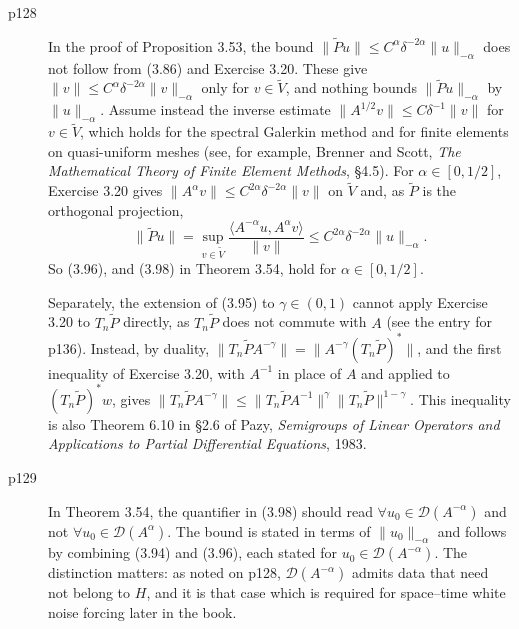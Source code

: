 \documentclass[final]{article}
\theoremstyle{definition}
\begin{document}
\begin{enumerate}
\begin{description}
   \item[p128] In the proof of Proposition 3.53, the bound
$\|\tilde P u\|\le C^\alpha\delta^{-2\alpha}\|u\|_{-\alpha}$ does not follow
from (3.86) and Exercise 3.20. These give
$\|v\|\le C^\alpha\delta^{-2\alpha}\|v\|_{-\alpha}$ only for $v\in\tilde V$,
and nothing bounds $\|\tilde Pu\|_{-\alpha}$ by $\|u\|_{-\alpha}$. Assume
instead the inverse estimate $\|A^{1/2}v\|\le C\delta^{-1}\|v\|$ for
$v\in\tilde V$, which holds for the spectral Galerkin method and for finite
elements on quasi-uniform meshes (see, for example, Brenner and Scott,
\emph{The Mathematical Theory of Finite Element Methods}, \S4.5). For
$\alpha\in[0,1/2]$, Exercise 3.20 gives
$\|A^\alpha v\|\le C^{2\alpha}\delta^{-2\alpha}\|v\|$ on $\tilde V$ and, as
$\tilde P$ is the orthogonal projection,
\[
\|\tilde Pu\|=\sup_{v\in\tilde V}\frac{\langle A^{-\alpha}u,A^{\alpha}v\rangle}{\|v\|}
\le C^{2\alpha}\delta^{-2\alpha}\|u\|_{-\alpha}.
\]
So (3.96), and (3.98) in Theorem 3.54, hold for $\alpha\in[0,1/2]$.

Separately, the extension of (3.95) to $\gamma\in(0,1)$ cannot apply Exercise
3.20 to $T_n\tilde P$ directly, as $T_n\tilde P$ does not commute with $A$ (see
the entry for p136). Instead, by duality,
$\|T_n\tilde PA^{-\gamma}\|=\|A^{-\gamma}(T_n\tilde P)^*\|$, and the first
inequality of Exercise 3.20, with $A^{-1}$ in place of $A$ and applied to
$(T_n\tilde P)^*w$, gives
$\|T_n\tilde PA^{-\gamma}\|\le\|T_n\tilde PA^{-1}\|^{\gamma}\|T_n\tilde
P\|^{1-\gamma}$. This inequality is also Theorem 6.10 in \S2.6 of
Pazy, \emph{Semigroups of Linear Operators and Applications to Partial
Differential Equations}, 1983.
   \item[p129] In Theorem 3.54, the quantifier in (3.98) should read
$\forall u_0\in\mathcal{D}(A^{-\alpha})$ and not
$\forall u_0\in\mathcal{D}(A^{\alpha})$. The bound is stated in terms of
$\|u_0\|_{-\alpha}$ and follows by combining (3.94) and (3.96), each stated for
$u_0\in\mathcal{D}(A^{-\alpha})$. The distinction matters: as noted on p128,
$\mathcal{D}(A^{-\alpha})$ admits data that need not belong to $H$, and it is
that case which is required for space--time white noise forcing later in the
book.


\end{description}
\end{enumerate}
\end{document}
